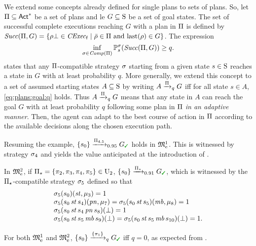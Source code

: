 We extend some concepts already defined for single plans to sets of
plans.  So, let $\plans\subseteq\Act^*$ be a set of plans and le
$G\subseteq\S$ be a set of goal states.  The set of successful
complete executions reaching $G$ with a plan in $\plans$ is defined
by
$\Succ(\plans,G)=\{{\rho\complete\in\cexecf}\mid{\bar{\rho}\in\plans \text{ and } \last(\rho)\in G}\}$.
%
The expression
%
\begin{equation}\label{eq:plans:goal:q}
  \inf_{\strat \in\Comp(\plans)}\Prob^\strat_s(\Succ(\plans,G)) \geq q.
\end{equation}
%
states that any $\plans$-compatible strategy $\strat$
starting from a given state $s\in\S$ reaches a state in $G$ with at
least probability $q$.
%
More generally, we extend this concept to a set of assumed starting
states $A\subseteq\S$ by writing $A \reach{\plans}_q G$ iff for all
state $s\in A$, \cref{eq:plans:goal:q} holds.
%
Thus $A \reach{\plans}_q G$ means that any state in $A$ can reach the
goal $G$ with at least probability $q$ following some plan in $\plans$
\emph{in an adaptive manner}. Then, the agent can adapt to the best course of action in $\plans$ according to the available decisions along the chosen execution path.

\begin{example}\label{ex:running:plans-exec}
  Resuming the example, $\{s_0\}\reach{\plans_{4,5}}_{0.95}G_{\goal}$
  holds in $\modelex^1$.  This is witnessed by strategy $\strat_4$ and
  yields the value anticipated at the introduction of
  .

  In $\modelex^2$, if
  $\plans_{\star}=\{\plan_2,\plan_3,\plan_4,\plan_5\}\in\Unc_2$,
  ${\{s_0\}\reach{\plans_{\star}}_{0.91}G_{\goal}}$, which is witnessed
  by the $\plans_{\star}$-compatible strategy $\strat_5$ defined so that
  \[
  \begin{array}{l}
    \strat_5(s_0)(\stairs,\mu_3)=1\\
    \strat_5(s_0\,\stairs\,s_4)(\panic,\mu_7)=\strat_5(s_0\,\stairs\,s_5)(\mobile,\mu_8)=1\\
    \strat_5(s_0\,\stairs\,s_4\,\panic\,s_8)(\complete)=1\\
    \strat_5(s_0\,\stairs\,s_5\,\mobile\,s_9)(\complete)=
    \strat_5(s_0\,\stairs\,s_5\,\mobile\,s_{10})(\complete)=1.
  \end{array}
  \]
  
  For both $\modelex^1$ and $\modelex^2$,
  $\{s_0\}\reach{\{\plan_1\}}_qG_{\goal}$ iff $q=0$, as expected from
  .
\end{example}

